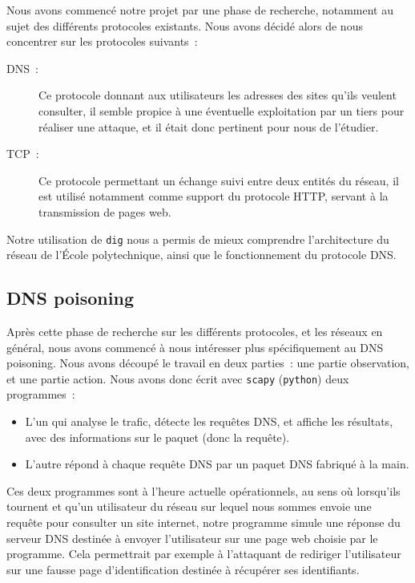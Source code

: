\documentclass[a4paper, 12pt,twoside]{article}
\begin{document}
    Nous avons commencé notre projet par une phase de recherche,  notamment au sujet des différents protocoles existants. Nous avons décidé alors de nous concentrer sur les protocoles suivants~:
    \begin{description}
        \item[DNS~:] Ce protocole donnant aux utilisateurs les adresses des sites qu'ils veulent consulter, il semble propice à une éventuelle exploitation par un tiers pour réaliser une attaque, et il était donc pertinent pour nous de l'étudier.
        \item[TCP~:] Ce protocole permettant un échange suivi entre deux entités du réseau, il est utilisé notamment comme support du protocole HTTP, servant à la transmission de pages web.
    \end{description}

    Notre  utilisation de \verb!dig! nous a permis de mieux comprendre l'architecture du réseau de l'École polytechnique, ainsi que le fonctionnement du protocole DNS.

    \subsection{DNS poisoning}

    Après cette phase de recherche sur les différents protocoles, et les réseaux en général, nous avons commencé à nous intéresser plus spécifiquement au DNS poisoning. Nous avons découpé le travail en deux parties~: une partie observation, et une partie action. Nous avons donc écrit avec \verb!scapy! (\verb!python!) deux programmes~:
    \begin{itemize}[label=\color{bleu303}\textbullet{}]
        \item L'un qui analyse le trafic, détecte les requêtes DNS, et affiche les résultats, avec des informations sur le paquet (donc la requête).
        \item L'autre répond à chaque requête DNS par un paquet DNS fabriqué à la main.
    \end{itemize}

    Ces deux programmes sont à l'heure actuelle opérationnels, au sens où lorsqu'ils tournent et qu'un utilisateur du réseau sur lequel nous sommes envoie une requête pour consulter un site internet, notre programme simule une réponse du serveur DNS destinée à envoyer l'utilisateur sur une page web choisie par le programme. Cela permettrait par exemple à l'attaquant de rediriger l'utilisateur sur une fausse page d'identification destinée à récupérer ses identifiants.
\end{document}
